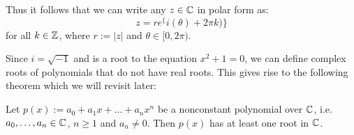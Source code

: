 Thus it follows that we can write any $z \in \mathbb{C}$ in polar form as:
\[ z = re^\{i(\theta) + 2\pi k)\} \]
for all $k \in \mathbb{Z}$, where $r := |z|$ and $\theta \in [0, 2\pi)$.

Since $i = \sqrt{-1}$ and is a root to the equation $x^2 + 1 = 0$, we can define complex roots of polynomials that do not have real roots. This gives rise to the following theorem which we will revisit later:

\begin{thmbox}
   Let $p(x) := a_0 + a_1x + \dots + a_nx^n$ be a nonconstant polynomial over $\mathbb{C}$, i.e. $a_0, \dots, a_n \in \mathbb{C}$, $n \geq 1$ and $a_n \neq 0$. Then $p(x)$ has at least one root in $\mathbb{C}$.
\end{thmbox}


